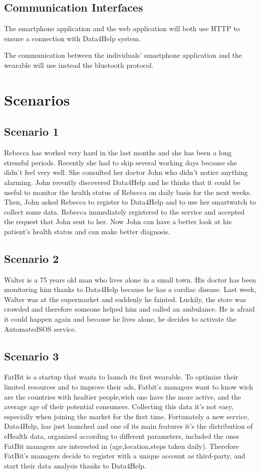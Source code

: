 \subsection{Communication Interfaces}
The smartphone application and the web application will both use HTTP to ensure a connection with Data4Help system.

The communication between the individuals' smartphone application and the wearable will use instead the bluetooth protocol.

\section{Scenarios}
\subsection{Scenario 1}

Rebecca has worked very hard in the last months and she has been a long stressful periods. Recently she had to skip several working days because she didn't feel very well. 
She consulted her doctor John who didn't notice anything alarming.
John recently discovered Data4Help and he thinks that it could be useful to monitor the health status of Rebecca on daily basis for the next weeks.
Then, John asked Rebecca to register to Data4Help and to use her smartwatch to collect some data.
Rebecca immediately registered to the service and accepted the request that John sent to her.
Now John can have a better look at his patient's health status and can make better diagnosis.


\subsection{Scenario 2}
Walter is a 75 years old man who lives alone in a small town.
His doctor has been monitoring him thanks to Data4Help because he has a cardiac disease.
Last week, Walter was at the supermarket and suddenly he fainted. Luckily, the store was crowded and therefore someone helped him and called an ambulance.
He is afraid it could happen again and because he lives alone, he decides to activate the AutomatedSOS service.


\subsection{Scenario 3}
FatBit is a startup that wants to launch its first wearable. To optimize their limited resources and to improve their ads, Fatbit's managers want to know wich are the countries with healtier people,wich one have the more active, and the average age of their potential consumers. Collecting this data it's not easy, especially when joining the market for the first time. Fortunately a new service, Data4Help, has just launched and one of its main features it's the distribution of eHealth data, organized according to different parameters, included the ones FatBit managers are interested in (age,location,steps taken daily).
Therefore FatBit's managers decide to register with a unique account as third-party, and start their data analysis thanks to Data4Help.


